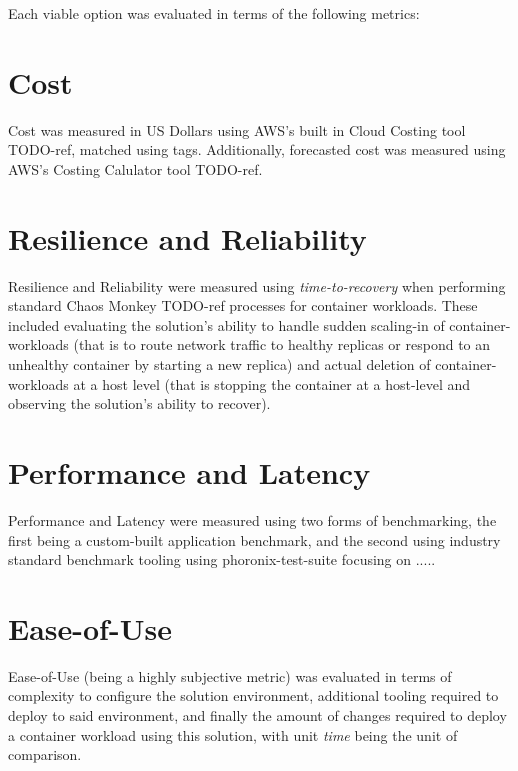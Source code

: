 Each viable option was evaluated in terms of the following metrics:
\section{Cost}
Cost was measured in US Dollars using AWS's built in Cloud Costing tool TODO-ref, matched using tags.
Additionally, forecasted cost was measured using AWS's Costing Calulator tool TODO-ref.

\section{Resilience and Reliability}
Resilience and Reliability were measured using \textit{time-to-recovery} when performing standard Chaos Monkey TODO-ref processes for container workloads.
These included evaluating the solution's ability to handle sudden scaling-in of container-workloads (that is to route network traffic to healthy replicas or respond to an unhealthy container by starting a new replica)
and actual deletion of container-workloads at a host level (that is stopping the container at a host-level and observing the solution's ability to recover).

\section{Performance and Latency}
Performance and Latency were measured using two forms of benchmarking, the first being a custom-built application benchmark, and the second using industry standard benchmark tooling using phoronix-test-suite focusing on .....

\section{Ease-of-Use}
Ease-of-Use (being a highly subjective metric) was evaluated in terms of complexity to configure the solution environment, additional tooling required to deploy to said environment,
and finally the amount of changes required to deploy a container workload using this solution, with unit \textit{time} being the unit of comparison.
